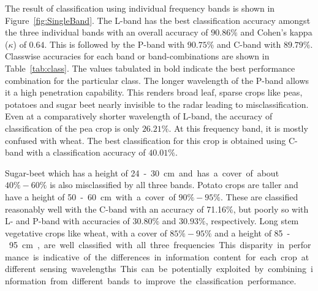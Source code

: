 The result of classification using individual frequency bands is shown in Figure~\ref{fig:SingleBand}. The L-band has the best classification accuracy amongst the three individual bands with an overall accuracy of $90.86\%$ and Cohen's kappa ($\kappa$) of $0.64$. This is followed by the P-band with $90.75\%$ and C-band with $89.79\%$. 
Classwise accuracies for each band or band-combinations are shown in Table~\ref{tab:class}. The values tabulated in bold indicate the best performance combination for the particular class. 
The longer wavelength of the P-band allows it a high penetration capability. This renders broad leaf, sparse crops like peas, potatoes and sugar beet nearly invisible to the radar leading to misclassification. Even at a comparatively shorter wavelength of L-band, the accuracy of classification of the pea crop is only $26.21\%$. 
At this frequency band, it is mostly confused with wheat. 
The best classification for this crop is obtained using C-band with a classification accuracy of $40.01\%$. 

Sugar-beet which has a height of \SI{24}-\SI{30}{cm} and has a cover of about $40\% - 60\%$ is also misclassified by all three bands. 
Potato crops are taller and have a height of \SI{50}-\SI{60}{cm} with a cover of $90\% - 95\%$. These are classified reasonably well with the C-band with an accuracy of 71.16\%, but poorly so with L- and P-band with accuracies of $30.80\%$ and $30.93\%$, respectively. 
Long stem vegetative crops like wheat, with a cover of $85\% - 95\%$ and a height of \SI{85}-\SI{95}{cm}, are well classified with all three frequencies. 
This disparity in performance is indicative of the differences in information content for each crop at different sensing wavelengths. This can be potentially exploited by combining information from different bands to improve the classification performance. 






